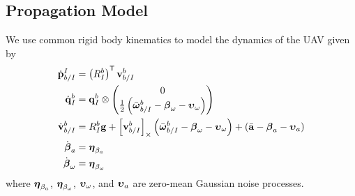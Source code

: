 
\subsection{Propagation Model}
We use common rigid body kinematics to model the dynamics of
the UAV given by
\begin{align}
  \dot{\boldsymbol{\mathrm{p}}}_{b/I}^I
  &=
  \left( R_I^b \right)^{\mathsf{T}} \boldsymbol{\mathrm{v}}_{b/I}^b
  \label{eq:uav_dynamics}
  \\
  \dot{\boldsymbol{\mathrm{q}}}_{I}^{b} 
	&= 	
  \boldsymbol{\mathrm{q}}_I^b \otimes \begin{pmatrix} 0 \\ \frac{1}{2}
    \left( \bar{\boldsymbol{\mathrm{\omega}}}_{b/I}^b - \boldsymbol{\mathrm{\beta}}_\omega - \boldsymbol{\mathrm{\upsilon}}_\omega \right)
\end{pmatrix} \nonumber \\
  \dot{\boldsymbol{\mathrm{v}}}_{b/I}^b 
  &=
  R_I^b \boldsymbol{\mathrm{g}}
  +
  \left[ \boldsymbol{\mathrm{v}}_{b/I}^b \right]_{\times}
  \left( \bar{\boldsymbol{\mathrm{\omega}}}_{b/I}^b - \boldsymbol{\mathrm{\beta}}_\omega -
  \boldsymbol{\mathrm{\upsilon}}_\omega \right)
  +
  \left( \bar{\boldsymbol{\mathrm{a}}} - \boldsymbol{\mathrm{\beta}}_a - \boldsymbol{\mathrm{\upsilon}}_a \right) \nonumber
  \\
  \dot{\boldsymbol{\mathrm{\beta}}}_a &= \boldsymbol{\mathrm{\eta}}_{\beta_a} \nonumber
  \\
  \dot{\boldsymbol{\mathrm{\beta}}}_\omega &= \boldsymbol{\mathrm{\eta}}_{\beta_\omega} \nonumber
\end{align}
where $\boldsymbol{\mathrm{\eta}}_{\beta_a}$, $\boldsymbol{\mathrm{\eta}}_{\beta_\omega}$,
$\boldsymbol{\mathrm{\upsilon}}_\omega$, and $\boldsymbol{\mathrm{\upsilon}}_a$
are zero-mean Gaussian noise processes.

